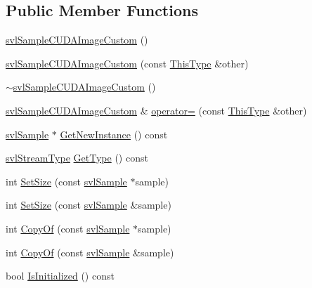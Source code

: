 \subsection*{Public Member Functions}
\begin{DoxyCompactItemize}
\item 
\hyperlink{classsvl_sample_c_u_d_a_image_custom_a53500b9b88f656f890789c600953f2f4}{svl\-Sample\-C\-U\-D\-A\-Image\-Custom} ()
\item 
\hyperlink{classsvl_sample_c_u_d_a_image_custom_aef24b0920d513ab377df35e72333f694}{svl\-Sample\-C\-U\-D\-A\-Image\-Custom} (const \hyperlink{classsvl_sample_c_u_d_a_image_custom}{This\-Type} \&other)
\item 
\hyperlink{classsvl_sample_c_u_d_a_image_custom_a866c47618c6763fc7e8a46c8bedff607}{$\sim$svl\-Sample\-C\-U\-D\-A\-Image\-Custom} ()
\item 
\hyperlink{classsvl_sample_c_u_d_a_image_custom}{svl\-Sample\-C\-U\-D\-A\-Image\-Custom} \& \hyperlink{classsvl_sample_c_u_d_a_image_custom_a7af0e47ca3433ab37893354ff0e6c310}{operator=} (const \hyperlink{classsvl_sample_c_u_d_a_image_custom}{This\-Type} \&other)
\item 
\hyperlink{classsvl_sample}{svl\-Sample} $\ast$ \hyperlink{classsvl_sample_c_u_d_a_image_custom_a8978ea89a71df5b4b23dc0b0f6f0b233}{Get\-New\-Instance} () const 
\item 
\hyperlink{svl_definitions_8h_aa00696d338a58db361335a01fd11e122}{svl\-Stream\-Type} \hyperlink{classsvl_sample_c_u_d_a_image_custom_a8a69cb31980239dd0063aa21a742f4c7}{Get\-Type} () const 
\item 
int \hyperlink{classsvl_sample_c_u_d_a_image_custom_a89befc3335ed2ddef86b4435bb357ca9}{Set\-Size} (const \hyperlink{classsvl_sample}{svl\-Sample} $\ast$sample)
\item 
int \hyperlink{classsvl_sample_c_u_d_a_image_custom_af233c4d9493dab2a10c307212e565802}{Set\-Size} (const \hyperlink{classsvl_sample}{svl\-Sample} \&sample)
\item 
int \hyperlink{classsvl_sample_c_u_d_a_image_custom_acb3ccb03ab61127574e7dd76f3fa1574}{Copy\-Of} (const \hyperlink{classsvl_sample}{svl\-Sample} $\ast$sample)
\item 
int \hyperlink{classsvl_sample_c_u_d_a_image_custom_a686a74b9f5215dbb14d6e8ad8e890308}{Copy\-Of} (const \hyperlink{classsvl_sample}{svl\-Sample} \&sample)
\item 
bool \hyperlink{classsvl_sample_c_u_d_a_image_custom_af7617f8ba9cd4079f2f630ab6024c81e}{Is\-Initialized} () const 
\item 

\end{DoxyCompactItemize}
